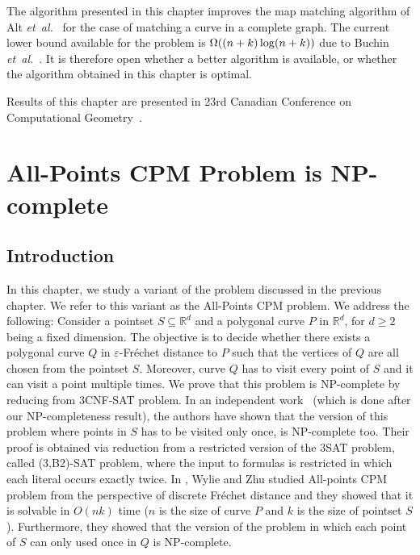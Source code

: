 \documentclass[12pt]{dalthesis}
\newcommand{\IR}{\ensuremath{\mathbb{R}}}
\newcommand{\gee}{\geqslant}
\newcommand{\eps}{\varepsilon}
\newcommand{\bigOmega}{{\rm\Omega}}
\newcommand{\etal}{{\em et~al.\/}}
\newcommand{\Frechet}{Fr\'echet }
\newcommand{\pset}{S}
\begin{document}
The algorithm presented in this chapter improves
the map matching algorithm of Alt \etal~\cite{AltERW03a} 
for the case of matching a curve in a complete graph.
The current lower bound available for the problem is $\bigOmega((n+k) \log (n+k))$
due to Buchin \etal~\cite{LowerBound-FD}.
It is therefore open whether a better algorithm is available,
or whether the algorithm obtained in this chapter is optimal.



Results of this chapter 
are presented in 23rd Canadian Conference on 
Computational Geometry~\cite{oursCCCG2011}.

































\chapter{All-Points CPM Problem is NP-complete}
\label{ch:NP-Complete}

\section{Introduction}
In this chapter, we study 
a variant of the problem discussed in the previous chapter. 
We refer to this variant as the All-Points CPM problem. We address the following:
Consider a pointset $S \subseteq \IR^d$ and a polygonal curve $P$ in $\IR^d$, 
for $d \gee 2$ being a fixed dimension.
The objective is to decide whether there exists a polygonal curve $Q$ in  $\eps$-\Frechet
distance to $P$ such that the vertices of $Q$ are all chosen from the 
pointset $\pset$. Moreover, curve $Q$ has to visit every point of $\pset$
and it can visit a point multiple times. 
We  prove  that  this problem  is  NP-complete  by  reducing from 3CNF-SAT problem.
In an independent work~\cite{NPComplete-Pointset} (which is done after   
our NP-completeness result), the authors have shown that
the version of this problem where points in $\pset$ has to 
be visited only once, is NP-complete too. 
Their proof is obtained via reduction
from a restricted version of the 3SAT problem, 
called (3,B2)-SAT problem,
where the input to formulas is restricted
in which each literal occurs exactly twice.
In \cite{DiscretelyFollowing},  
Wylie and Zhu studied 
All-points CPM problem from the 
perspective of discrete \Frechet distance
and they showed that it is solvable in 
$O(nk)$ time ($n$ is the size of curve $P$ and $k$ is the size of  pointset $\pset$). 
Furthermore, they showed that the version of the problem in which 
each point of $\pset$ can only used once in $Q$ is  NP-complete.
\end{document}
